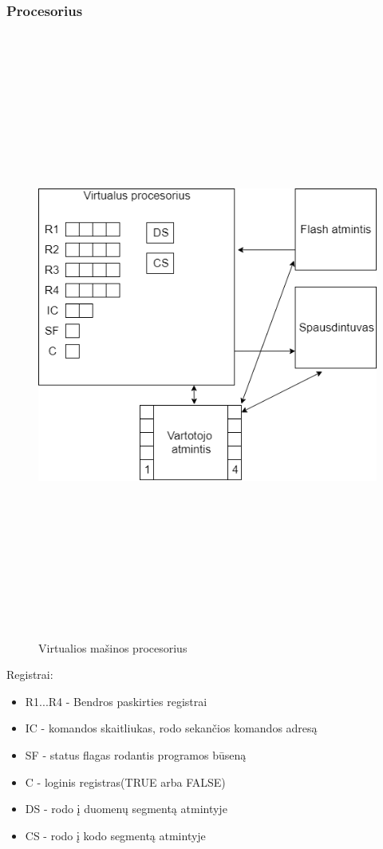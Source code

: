 \documentclass[oneside]{VUMIFPSkursinis}
\begin{document}
	\subsubsection{Procesorius}
\begin{figure}[H]
		\centering	
	\includegraphics[width=18cm,height=20cm,keepaspectratio]{VMProcesorius.png}
	\caption{Virtualios mašinos procesorius}
	\label{fig:Virtualios mašinos procesorius}
\end{figure}
Registrai:
\begin{itemize}
	\item{R1...R4 - Bendros paskirties registrai}
	\item{IC - komandos skaitliukas, rodo sekančios komandos adresą }
	\item{SF - status flagas rodantis programos būseną}
	\item{C - loginis registras(TRUE arba FALSE)}
	\item{DS - rodo į duomenų segmentą atmintyje}
	\item{CS - rodo į kodo segmentą atmintyje}
\end{itemize}
\end{document}
